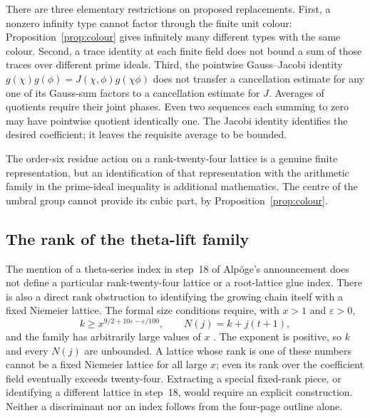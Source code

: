 \documentclass[11pt]{article}
\theoremstyle{definition}
\theoremstyle{remark}
\begin{document}
There are three elementary restrictions on proposed replacements.
First, a nonzero infinity type cannot factor through the finite unit
colour: Proposition~\ref{prop:colour} gives infinitely many different
types with the same colour.  Second, a trace identity at each finite
field does not bound a sum of those traces over different prime ideals.
Third, the pointwise Gauss--Jacobi identity
$g(\chi)g(\phi)=J(\chi,\phi)g(\chi\phi)$ does not transfer a
cancellation estimate for any one of its Gauss-sum factors to a
cancellation estimate for $J$.  Averages of quotients require their
joint phases.  Even two sequences each summing to zero may have
pointwise quotient identically one.  The Jacobi identity identifies the
desired coefficient; it leaves the requisite average to be bounded.

The order-six residue action on a rank-twenty-four lattice is a genuine
finite representation, but an identification of that representation
with the arithmetic family in the prime-ideal inequality is additional
mathematics.  The centre of the umbral group cannot provide its cubic
part, by Proposition~\ref{prop:colour}.

\subsection{The rank of the theta-lift family}

The mention of a theta-series index in step~18 of Alp\"oge's
announcement \cite[p.~4]{Alpoge} does not define a particular rank-twenty-four
lattice or a root-lattice glue index.  There is also a direct rank
obstruction to identifying the growing chain itself with a fixed
Niemeier lattice.  The formal size conditions require, with
$x>1$ and $\varepsilon>0$,
\[
 k\geq x^{9/2+10\varepsilon-\varepsilon/100},
 \qquad N(j)=k+j(t+1),
\]
and the family has arbitrarily large values of $x$
\cite[\texttt{SizeK}, \texttt{Ranks.N}, \texttt{FamCore.Win\_unb}]{AlpogeRanks}.
The exponent is positive, so $k$ and every $N(j)$ are unbounded.
A lattice whose rank is one of these numbers cannot be a fixed
Niemeier lattice for all large $x$; even its rank over the coefficient
field eventually exceeds twenty-four.  Extracting a special fixed-rank
piece, or identifying a different lattice in step~18, would require an
explicit construction.  Neither a discriminant nor an index follows
from the four-page outline alone.
\end{document}
